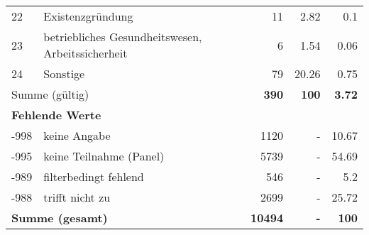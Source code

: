 \begin{longtable}{lXrrr}
        22 & \multicolumn{1}{X}{Existenzgründung} & %
          \num{11} &
          \num[round-mode=places,round-precision=2]{2,82} &
          \num[round-mode=places,round-precision=2]{0,1} \\

        23 & \multicolumn{1}{X}{betriebliches Gesundheitswesen, Arbeitssicherheit} & %
          \num{6} &
          \num[round-mode=places,round-precision=2]{1,54} &
          \num[round-mode=places,round-precision=2]{0,06} \\

        24 & \multicolumn{1}{X}{Sonstige} & %
          \num{79} &
          \num[round-mode=places,round-precision=2]{20,26} &
          \num[round-mode=places,round-precision=2]{0,75} \\

     \midrule
     \multicolumn{2}{l}{Summe (gültig)} &
       \textbf{\num{390}} &
     \textbf{100} &
       \textbf{\num[round-mode=places,round-precision=2]{3,72}} \\
     \multicolumn{5}{l}{\textbf{Fehlende Werte}}\\
       -998 &
       keine Angabe &
         \num{1120} &
        - &
         \num[round-mode=places,round-precision=2]{10,67} \\
       -995 &
       keine Teilnahme (Panel) &
         \num{5739} &
        - &
         \num[round-mode=places,round-precision=2]{54,69} \\
       -989 &
       filterbedingt fehlend &
         \num{546} &
        - &
         \num[round-mode=places,round-precision=2]{5,2} \\
       -988 &
       trifft nicht zu &
         \num{2699} &
        - &
         \num[round-mode=places,round-precision=2]{25,72} \\
     \midrule
     \multicolumn{2}{l}{\textbf{Summe (gesamt)}} &
          \textbf{\num{10494}} &
        \textbf{-} &
        \textbf{100} \\
     \bottomrule
     \end{longtable}
     
